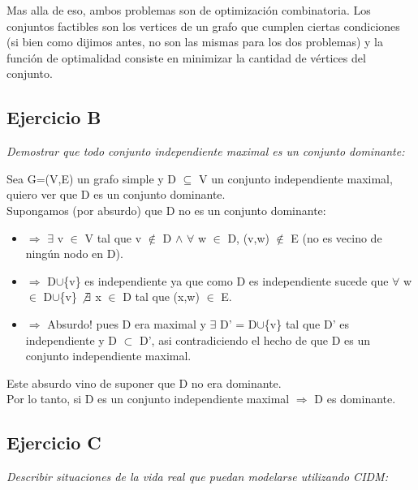 \medskip

Mas alla de eso, ambos problemas son de optimización combinatoria. Los conjuntos factibles son los vertices de un grafo que cumplen ciertas condiciones (si bien como dijimos antes, no son las mismas para los dos problemas) y la función de optimalidad consiste en minimizar la cantidad de vértices del conjunto.

\newpage

\subsection{Ejercicio B}

\textit{Demostrar que todo conjunto independiente maximal es un conjunto dominante:}

\medskip

Sea G=(V,E) un grafo simple y D $\subseteq$ V un conjunto independiente maximal, quiero ver que D es un conjunto dominante.\\
Supongamos (por absurdo) que D no es un conjunto dominante:
\begin{itemize}
\item[] $\Rightarrow$ $\exists$ v $\in$ V tal que v $\not\in$ D $\wedge$ $\forall$ w $\in$ D, (v,w) $\not\in$ E (no es vecino de ningún nodo en D).
\item[] $\Rightarrow$ D$\cup$\{v\} es independiente ya que como D es independiente sucede que $\forall$ w $\in$ D$\cup$\{v\} $\not\exists$ x $\in$ D tal que (x,w) $\in$ E.
\item[] $\Rightarrow$ Absurdo! pues D era maximal y $\exists$ D' = D$\cup$\{v\} tal que D' es independiente y D $\subset$ D', asi contradiciendo el hecho de que D es un conjunto independiente maximal.
\end{itemize}
Este absurdo vino de suponer que D no era dominante.\\
Por lo tanto, si D es un conjunto independiente maximal $\Rightarrow$ D es dominante.

\subsection{Ejercicio C}

\textit{Describir situaciones de la vida real que puedan modelarse utilizando CIDM:}

\medskip

